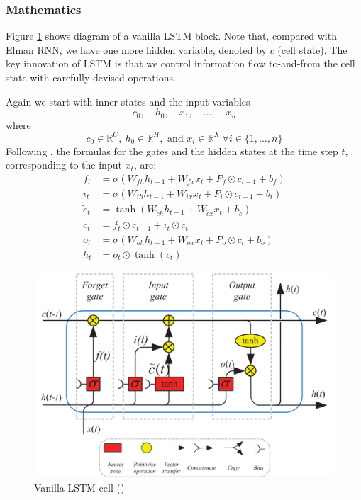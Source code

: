 \subsubsection*{Mathematics}
Figure \ref{fig:lstm-architecture} shows diagram of a vanilla LSTM block. Note that, compared with Elman RNN, we have one more hidden variable, denoted by $c$ (cell state). The key innovation of LSTM is that we control information flow to-and-from the cell state with carefully devised operations.

Again we start with inner states and the input variables
$$ c_0, \quad h_0, \quad x_1, \quad \dots, \quad x_n $$
where 
$$c_0\in\mathbb{R}^C,\ h_0\in\mathbb{R}^H, \textrm{ and } x_i\in\mathbb{R}^X\ \forall i\in\{1,\dots,n\}$$
Following \cite{yuReviewRecurrentNeural2019}, the formulas for the gates and the hidden states at the time step $t$, corresponding to the input $x_t$, are:
\begin{align}
    f_t &= \sigma\left( W_{fh}h_{t-1} + W_{fx}x_t + P_f \odot c_{t-1} + b_f \right) \\
    i_t &= \sigma\left( W_{ih}h_{t-1} + W_{ix}x_t + P_i \odot c_{t-1} + b_i \right) \\
    \tilde{c}_t &= \tanh\left( W_{\tilde{c}h}h_{t-1} + W_{\tilde{c}x}x_t + b_{\tilde{c}} \right) \\
    c_t &= f_t \odot c_{t-1} + i_t \odot \tilde{c}_t \\
    o_t &= \sigma\left( W_{oh}h_{t-1} + W_{ox}x_t + P_o \odot c_t + b_o \right) \\
    h_t &= o_t \odot \tanh(c_t)
\end{align}

\begin{figure}[!b]
    \begin{center}
        \includegraphics[scale=0.55]{Images/lstm-architecture.png}
        \caption{Vanilla LSTM cell (\cite{yuReviewRecurrentNeural2019})}
        \label{fig:lstm-architecture}
    \end{center}
\end{figure}

